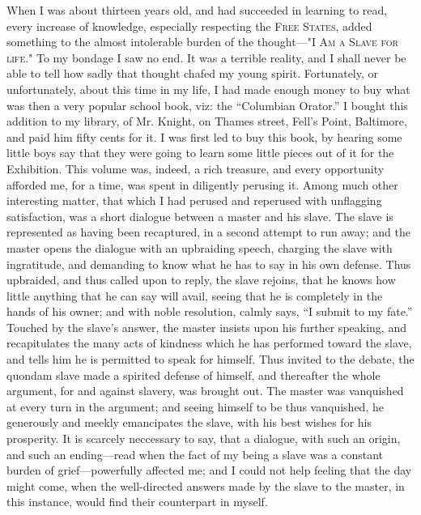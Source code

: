 When I was about thirteen years old, and had succeeded in learning to
read, every increase of knowledge, especially respecting the
\textsc{Free States}, added something to the almost intolerable burden
of the thought---"\textsc{I Am a Slave for life}." To my bondage I saw
no end. It was a terrible reality, and I shall never be able to tell how
sadly that thought chafed my young spirit. Fortunately, or
{}unfortunately, about this time in my life, I had made enough money to
buy what was then a very popular school book, viz: the ``Columbian
Orator.'' I bought this addition to my library, of Mr. Knight, on Thames
street, Fell's Point, Baltimore, and paid him fifty cents for it. I was
first led to buy this book, by hearing some little boys say that they
were going to learn some little pieces out of it for the Exhibition.
This volume was, indeed, a rich treasure, and every opportunity afforded
me, for a time, was spent in diligently perusing it. Among much other
interesting matter, that which I had perused and reperused with
unflagging satisfaction, was a short dialogue between a master and his
slave. The slave is represented as having been recaptured, in a second
attempt to run away; and the master opens the dialogue with an
upbraiding speech, charging the slave with ingratitude, and demanding to
know what he has to say in his own defense. Thus upbraided, and thus
called upon to reply, the slave rejoins, that he knows how little
anything that he can say will avail, seeing that he is completely in the
hands of his owner; and with noble resolution, calmly says, ``I submit
to my fate.'' Touched by the slave's answer, the master insists upon his
further speaking, and recapitulates the many acts of kindness which he
has performed toward the slave, and tells him he is permitted to speak
for himself. Thus invited to the debate, the quondam slave made a
spirited defense of himself, and thereafter the whole argument, for and
against slavery, was brought out. The master was vanquished at every
turn in the argument; and seeing himself to be thus vanquished, he
{}generously and meekly emancipates the slave, with his best wishes for
his prosperity. It is scarcely neccessary to say, that a dialogue, with
such an origin, and such an ending---read when the fact of my being a
slave was a constant burden of grief---powerfully affected me; and I
could not help feeling that the day might come, when the well-directed
answers made by the slave to the master, in this instance, would find
their counterpart in myself.

